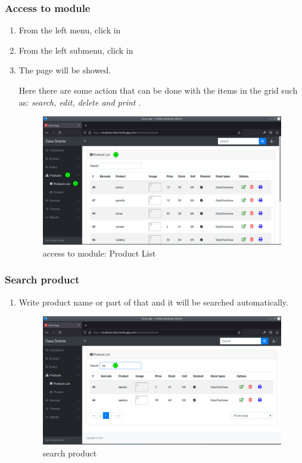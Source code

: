 \documentclass[a4paper,11pt]{refart}
\begin{document}
\subsubsection{Access to module}
\begin{enumerate}
	\item From the left menu, click in  
	\item From the left submenu, click in  
	\item The page will be showed.
	\medskip
	\begin{leftbar}
		Here there are some action that can be done with the items in the grid such as: \emph{search, edit, delete and print} .
	\end{leftbar}
	\begin{figure}[H]\centering
		\includegraphics[width=\textwidth]{images/produc_list-access.png}
		\caption{access to module: Product List}
		\label{fig:produc_list-access.png}
	\end{figure}
\end{enumerate}

\subsubsection{Search product}\label{section:product_search}
\begin{enumerate}
	\item Write product name or part of that and it will be searched automatically.
	\begin{figure}[H]\centering
		\includegraphics[width=\textwidth]{images/produc_list-search.png}
		\caption{search product}
		\label{fig:produc_list-search.png}
	\end{figure}
\end{enumerate}
\end{document}
